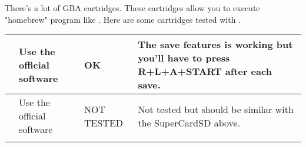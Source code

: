 There's a lot of GBA cartridges. These cartridges allow you to execute "homebrew" program like \FAT.
Here are some cartridges tested with \FAT.

\tablelasttail{\hline}
\begin{supertabular}{|p{3.5cm}|l|l|l|}
    \hline
        \begin{minipage}[c]{3cm}
        \vspace{0.5cm}
        \end{minipage} &
        \begin{minipage}{3cm}
        Use the official software
        \end{minipage} &
        \begin{minipage}{2cm}
        \textcolor{vert}{OK}
        \end{minipage} &
        \begin{minipage}{7cm}
        The save features is working but you'll have to press R+L+A+START after each save.
        \end{minipage} \\
    \hline
        \begin{minipage}[c]{3cm}
        \vspace{0.5cm}
        \end{minipage} &
        \begin{minipage}{3cm}
        Use the official software
        \end{minipage} &
        \begin{minipage}{2cm}
        \textcolor{bleu}{NOT TESTED}
        \end{minipage} &
        \begin{minipage}{7cm}
        Not tested but should be similar with the SuperCardSD above.
        \end{minipage} \\
    \hline
        \begin{minipage}[c]{3cm}
        \vspace{0.5cm}
        \end{minipage} &
        \begin{minipage}{3cm}

\end{minipage}
\end{supertabular}
